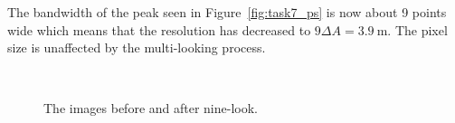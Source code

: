 \documentclass[12pt,a4paper]{article}
\begin{document}
The bandwidth of the peak seen in Figure~\ref{fig:task7_ps} is now about 9 points wide which means that the resolution has decreased to $9\Delta A=\SI{3.9}{\metre}$. The pixel size is unaffected by the multi-looking process.
\begin{figure}[ht!]
  \centering
    \begin{subfigure}[b]{0.59\textwidth}
        \noindent{}
        \label{fig:task7_f}
    \end{subfigure}\\
    \begin{subfigure}[b]{0.59\textwidth}
        \noindent{}
        \label{fig:task7_nlf}
    \end{subfigure}
  \caption{The images before and after nine-look.}
  \label{fig:task7_img}
\end{figure}
\end{document}
